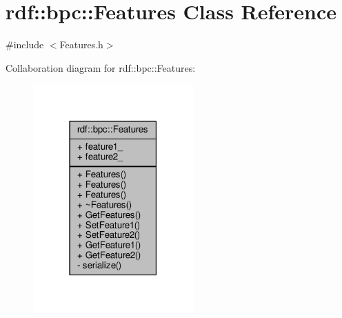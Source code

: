 \hypertarget{classrdf_1_1bpc_1_1Features}{}\section{rdf\+:\+:bpc\+:\+:Features Class Reference}
\label{classrdf_1_1bpc_1_1Features}


{\ttfamily \#include $<$Features.\+h$>$}



Collaboration diagram for rdf\+:\+:bpc\+:\+:Features\+:
\nopagebreak
\begin{figure}[H]
\begin{center}
\leavevmode
\includegraphics[width=174pt]{classrdf_1_1bpc_1_1Features__coll__graph}
\end{center}
\end{figure}
